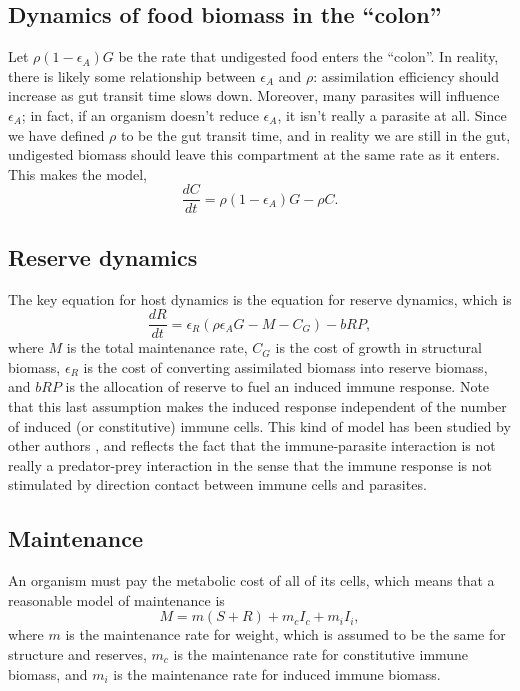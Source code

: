 \documentclass[12pt,reqno,final,pdftex]{amsart}\usepackage[]{graphicx}\usepackage[]{color}
\theoremstyle{plain}
\numberwithin{equation}{part}
\begin{document}
\subsection*{Dynamics of food biomass in the ``colon''}
Let $\rho (1-\epsilon_A) G$ be the rate that undigested food enters the ``colon''.
In reality, there is likely some relationship between $\epsilon_A$ and $\rho$: assimilation efficiency should increase as gut transit time slows down.
Moreover, many parasites will influence $\epsilon_A$; in fact, if an organism doesn't reduce $\epsilon_A$, it isn't really a parasite at all.
Since we have defined $\rho$ to be the gut transit time, and in reality we are still in the gut, undigested biomass should leave this compartment at the same rate as it enters.
This makes the model,
\begin{equation}
\frac{dC}{dt} = \rho (1-\epsilon_A)G - \rho C.
\end{equation}

\subsection*{Reserve dynamics}
The key equation for host dynamics is the equation for reserve dynamics, which is
\begin{equation}
\frac{dR}{dt}=\epsilon _R\left(\rho \epsilon_A G-M-C_G\right)-b R P,
\end{equation}
where $M$ is the total maintenance rate, $C_G$ is the cost of growth in structural biomass, $\epsilon _R$ is the cost of converting assimilated biomass into reserve biomass, and $bRP$ is the allocation of reserve to fuel an induced immune response.
Note that this last assumption makes the induced response independent of the number of induced (or constitutive) immune cells.
This kind of model has been studied by other authors \citep{Bonhoeffer1994,Alizon2005,Fenton2006,Hamilton2008}, and reflects the fact that the immune-parasite interaction is not really a predator-prey interaction in the sense that the immune response is not stimulated by direction contact between immune cells and parasites.

\subsection*{Maintenance}
An organism must pay the metabolic cost of all of its cells, which means that a reasonable model of maintenance is
\begin{equation}
M=m(S+R)+m_cI_c+m_iI_i,
\end{equation}
where $m$ is the maintenance rate for weight, which is assumed to be the same for structure and reserves, $m_c$ is the maintenance rate for constitutive immune biomass, and $m_i$ is the maintenance rate for induced immune biomass.
\end{document}
